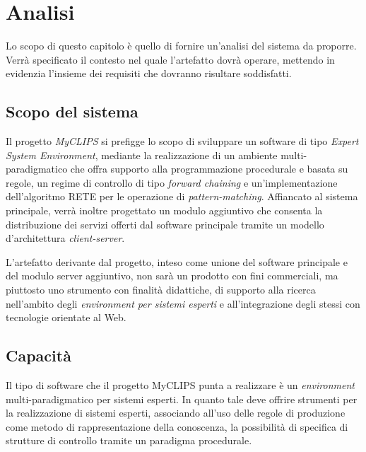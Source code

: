 
\chapter{Analisi}

Lo scopo di questo capitolo è quello di fornire un'analisi del sistema da proporre. Verrà specificato il contesto nel quale l'artefatto dovrà operare, mettendo in evidenzia l'insieme dei requisiti che dovranno risultare soddisfatti. 

\section{Scopo del sistema}

Il progetto \emph{MyCLIPS} si prefigge lo scopo di sviluppare un software di tipo \emph{Expert System Environment}, mediante la realizzazione di un ambiente multi-paradigmatico che offra supporto alla programmazione procedurale e basata su regole, un regime di controllo di tipo \emph{forward chaining} e un'implementazione dell'algoritmo RETE per le operazione di \emph{pattern-matching}.
Affiancato al sistema principale, verrà inoltre progettato un modulo aggiuntivo che consenta la distribuzione dei servizi offerti dal software principale tramite un modello d'architettura \emph{client-server}.

L'artefatto derivante dal progetto, inteso come unione del software principale e del modulo server aggiuntivo, non sarà un prodotto con fini commerciali, ma piuttosto uno strumento con finalità didattiche, di supporto alla ricerca nell'ambito degli \emph{environment per sistemi esperti} e all'integrazione degli stessi con tecnologie orientate al Web.


%


%

\section{Capacità}

Il tipo di software che il progetto MyCLIPS punta a realizzare è un \emph{environment} multi-paradigmatico per sistemi esperti. In quanto tale deve offrire strumenti per la realizzazione di sistemi esperti, associando all'uso delle regole di produzione come metodo di rappresentazione della conoscenza, la possibilità di specifica di strutture di controllo tramite un paradigma procedurale.

